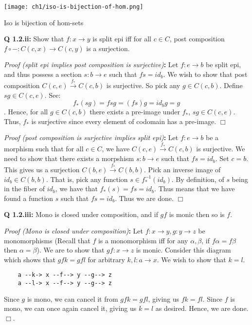 \documentclass[11pt]{book}
\def\qed{$\Box$}
\newcommand{\beginproof}[1][]{\emph{Proof #1}\textbf{:} }
\newcommand{\question}[1]{\textbf{#1}}
\begin{document}
\begin{minipage}{\textwidth}
\texttt{[image: ch1/iso-is-bijection-of-hom.png]}
    \begin{center}Iso is bijection of hom-sets\end{center}
\end{minipage}

\question{Q 1.2.ii:} Show that $f: x \rightarrow y$ is split epi iff for all $c \in C$, post composition
$f \circ - : C(c, x) \rightarrow C(c, y)$ is a surjection.


\beginproof[(split epi implies post composition is surjective)]
Let $f: e \rightarrow b$ be split epi, and thus possess a section $s: b \rightarrow e$ such that $fs = id_b$.
We wish to show that post composition $C(c, e) \xrightarrow{f_*} C(c, b)$ is surjective.
So pick any $g \in C(c, b)$. Define $sg \in C(c, e)$. See: $$f_*(sg) = fsg = (fs)g = id_b g = g$$.
Hence, for all $g \in C(c, b)$ there exists a pre-image under $f_*$, $sg \in C(c, e)$. Thus, $f_*$ is surjective
since every element of codomain has a pre-image. \qed


\beginproof[(post composition is surjective implies split epi)]
Let $f: e \to b$ be a morphism such that for all $c \in C$, we have $C(c, e) \xrightarrow{f_*} C(c, b)$ is surjective.
We need to show that there exists a morpshism $s: b \rightarrow e$ such that $fs = id_b$. Set $c = b$.
This gives us a surjection $C(b, e) \xrightarrow{f_*} C(b, b)$. Pick an inverse image of $id_b \in C(b, b)$. 
That is, pick any function $s \in f_*^{-1}(id_b)$. By definition, of $s$ being in the fiber of $id_b$,
we have that $f_*(s) = fs = id_b$. Thus means that we have found a function $s$ such that $fs = id_b$. Thus we are done.
\qed

\question{Q 1.2.iii:} Mono is closed under composition, and if $gf$ is monic then so is $f$.


\beginproof[(Mono is closed under composition)]
Let $f: x \to y, g: y \to z$ be monomorphisms (Recall that $f$ is a monomorphism iff for any $\alpha, \beta$, if $f \alpha = f \beta$ then $\alpha = \beta$).
We are to show that $gf: x \to z$ is monic.
Consider this diagram which shows that $gfk = gfl$ for arbitrary $k, l: a \to x$. We wish to show that $k=l$.

\begin{verbatim}
    a --k-> x --f--> y --g--> z
    a --l-> x --f--> y --g--> z
\end{verbatim}

Since $g$ is mono, we can cancel it from $gfk = gfl$, giving us $fk = fl$.
Since $f$ is mono, we can once again cancel it, giving us $k = l$ as desired.
Hence, we are done.  \qed.
\end{document}
